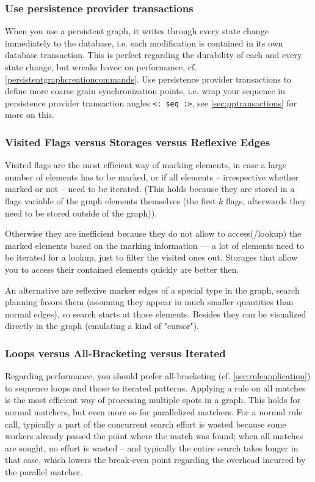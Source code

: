 \subsubsection*{Use persistence provider transactions}
When you use a persistent graph, it writes through every state change immediately to the database, i.e. each modification is contained in its own database transaction.
This is perfect regarding the durability of each and every state change, but wreaks havoc on performance, cf. \ref{persistentgraphcreationcommands}.
Use persistence provider transactions to define more coarse grain synchronization points, i.e. wrap your sequence in persistence provider transaction angles \verb#<: seq :>#, see \ref{sec:pptransactions} for more on this.

\subsubsection*{Visited Flags versus Storages versus Reflexive Edges}
Visited flags are the most efficient way of marking elements, in case a large number of elements has to be marked, or if all elements -- irrespective whether marked or not -- need to be iterated.
(This holds because they are stored in a flags variable of the graph elements themselves (the first $k$ flags, afterwards they need to be stored outside of the graph)).

Otherwise they are inefficient because they do not allow to access(/lookup) the marked elements based on the marking information ---
a lot of elements need to be iterated for a lookup, just to filter the visited ones out.
Storages that allow you to access their contained elements quickly are better then.

An alternative are reflexive marker edges of a special type in the graph, search planning favors them (assuming they appear in much smaller quantities than normal edges), so search starts at those elements. 
Besides they can be visualized directly in the graph (emulating a kind of "cursor").

\subsubsection*{Loops versus All-Bracketing versus Iterated}
Regarding performance, you should prefer all-bracketing (cf. \ref{sec:ruleapplication}) to sequence loops and those to iterated patterns.
Applying a rule on all matches is the most efficient way of processing multiple spots in a graph.
This holds for normal matchers, but even more so for parallelized matchers.
For a normal rule call, typically a part of the concurrent search effort is wasted because some workers already passed the point where the match was found; 
when all matches are sought, no effort is wasted -- and typically the entire search takes longer in that case, which lowers the break-even point regarding the overhead incurred by the parallel matcher.

